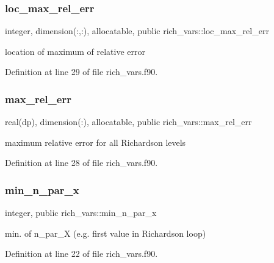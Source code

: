 \subsubsection{\texorpdfstring{loc\+\_\+max\+\_\+rel\+\_\+err}{loc\_max\_rel\_err}}
{\footnotesize\ttfamily integer, dimension(\+:,\+:), allocatable, public rich\+\_\+vars\+::loc\+\_\+max\+\_\+rel\+\_\+err}



location of maximum of relative error 



Definition at line 29 of file rich\+\_\+vars.\+f90.

\mbox{\label{namespacerich__vars_afac4d06d60829484cfb7d4964964945b}} 
\subsubsection{\texorpdfstring{max\+\_\+rel\+\_\+err}{max\_rel\_err}}
{\footnotesize\ttfamily real(dp), dimension(\+:), allocatable, public rich\+\_\+vars\+::max\+\_\+rel\+\_\+err}



maximum relative error for all Richardson levels 



Definition at line 28 of file rich\+\_\+vars.\+f90.

\mbox{\label{namespacerich__vars_a07841cccca6e6ee59aeb4e0661558eda}} 
\subsubsection{\texorpdfstring{min\+\_\+n\+\_\+par\+\_\+x}{min\_n\_par\_x}}
{\footnotesize\ttfamily integer, public rich\+\_\+vars\+::min\+\_\+n\+\_\+par\+\_\+x}



min. of {\ttfamily n\+\_\+par\+\_\+X} (e.\+g. first value in Richardson loop) 



Definition at line 22 of file rich\+\_\+vars.\+f90.

